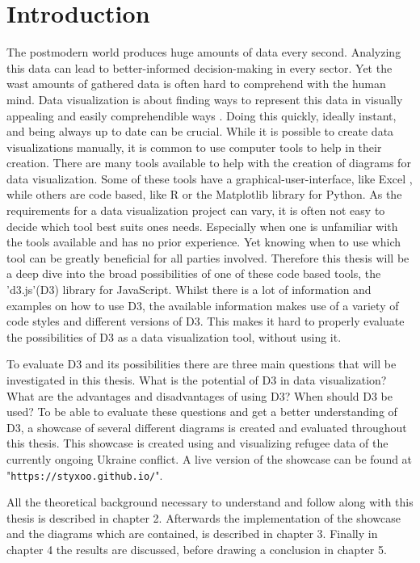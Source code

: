 \chapter{Introduction}


The postmodern world produces huge amounts of data every second. Analyzing this data can lead to better-informed decision-making in every sector. Yet the wast amounts of gathered data is often hard to comprehend with the human mind. Data visualization is about finding ways to represent this data in visually appealing and easily comprehendible ways \cite{sadiku2016data}. Doing this quickly, ideally instant, and being always up to date can be crucial. While it is possible to create data visualizations manually, it is common to use computer tools to help in their creation. There are many tools available to help with the creation of diagrams for data visualization. Some of these tools have a graphical-user-interface, like Excel \cite{excel}, while others are code based, like R \cite{r} or the Matplotlib \cite{matplotlib} library for Python. As the requirements for a data visualization project can vary, it is often not easy to decide which tool best suits ones needs. Especially when one is unfamiliar with the tools available and has no prior experience. Yet knowing when to use which tool can be greatly beneficial for all parties involved. Therefore this thesis will be a deep dive into the broad possibilities of one of these code based tools, the 'd3.js'(D3) library for JavaScript. Whilst there is a lot of information and examples on how to use D3, the available information makes use of a variety of code styles and different versions of D3. This makes it hard to properly evaluate the possibilities of D3 as a data visualization tool, without using it.

To evaluate D3 and its possibilities there are three main questions that will be investigated in this thesis. What is the potential of D3 in data visualization? What are the advantages and disadvantages of using D3? When should D3 be used? To be able to evaluate these questions and get a better understanding of D3, a showcase of several different diagrams is created and evaluated throughout this thesis. This showcase is created using and visualizing refugee data of the currently ongoing Ukraine conflict. A live version of the showcase can be found at "\texttt{https://styxoo.github.io/}".

All the theoretical background necessary to understand and follow along with this thesis is described in chapter 2. Afterwards the implementation of the showcase and the diagrams which are contained, is described in chapter 3. Finally in chapter 4 the results are discussed, before drawing a conclusion in chapter 5.
